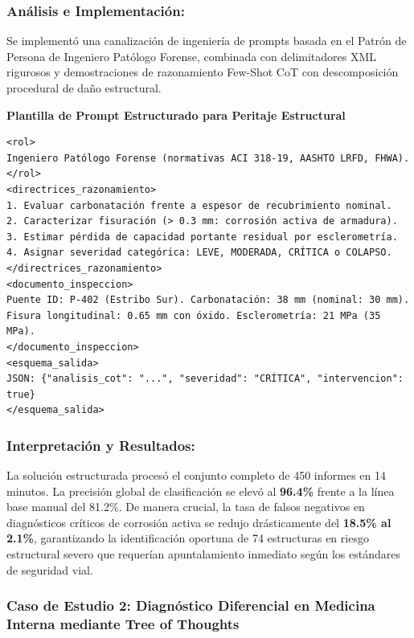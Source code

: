 \subsubsection*{Análisis e Implementación:}
Se implementó una canalización de ingeniería de prompts basada en el Patrón de Persona de Ingeniero Patólogo Forense, combinada con delimitadores XML rigurosos y demostraciones de razonamiento Few-Shot CoT con descomposición procedural de daño estructural.

\begin{tcolorbox}[colback=bg_marfil, colframe=unmsm_gold, arc=3pt, boxrule=0.6pt, top=0.2cm, bottom=0.2cm, left=0.35cm, right=0.35cm]
\footnotesize\sffamily
\textbf{Plantilla de Prompt Estructurado para Peritaje Estructural}\\[0.1cm]
\begin{verbatim}
<rol>
Ingeniero Patólogo Forense (normativas ACI 318-19, AASHTO LRFD, FHWA).
</rol>
<directrices_razonamiento>
1. Evaluar carbonatación frente a espesor de recubrimiento nominal.
2. Caracterizar fisuración (> 0.3 mm: corrosión activa de armadura).
3. Estimar pérdida de capacidad portante residual por esclerometría.
4. Asignar severidad categórica: LEVE, MODERADA, CRÍTICA o COLAPSO.
</directrices_razonamiento>
<documento_inspeccion>
Puente ID: P-402 (Estribo Sur). Carbonatación: 38 mm (nominal: 30 mm).
Fisura longitudinal: 0.65 mm con óxido. Esclerometría: 21 MPa (35 MPa).
</documento_inspeccion>
<esquema_salida>
JSON: {"analisis_cot": "...", "severidad": "CRÍTICA", "intervencion": true}
</esquema_salida>
\end{verbatim}
\end{tcolorbox}

\subsubsection*{Interpretación y Resultados:}
La solución estructurada procesó el conjunto completo de 450 informes en 14 minutos. La precisión global de clasificación se elevó al \textbf{96.4\%} frente a la línea base manual del 81.2\%. De manera crucial, la tasa de falsos negativos en diagnósticos críticos de corrosión activa se redujo drásticamente del \textbf{18.5\% al 2.1\%}, garantizando la identificación oportuna de 74 estructuras en riesgo estructural severo que requerían apuntalamiento inmediato según los estándares de seguridad vial.

\subsubsection{Caso de Estudio 2: Diagnóstico Diferencial en Medicina Interna mediante Tree of Thoughts}

